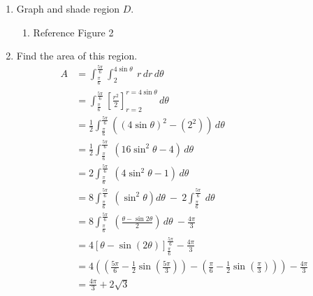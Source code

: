 \documentclass[letter,11pt]{article}
\begin{document}
\begin{enumerate}[label = \roman*.]
	\item Graph and shade region $D$.
	      \begin{enumerate}
	      	\item Reference Figure 2
	      \end{enumerate}
	\item Find the area of this region.
	      \begin{align*}
	      	A & = \int_{\frac{\pi}{6}}^{\frac{5\pi}{6}}\int_{2}^{4\sin\theta}\ r \, dr \,d\theta                                                                                           \\
	      	  & = \int_{\frac{\pi}{6}}^{\frac{5\pi}{6}}\left[\frac{r^2}{2}\right]_{r=2}^{r=4\sin\theta}\,d\theta                                                                           \\
	      	  & = \frac{1}{2}\int_{\frac{\pi}{6}}^{\frac{5\pi}{6}} \left(\left(4\sin\theta\right)^{2}-\left(2^{2}\right)\right) \, d\theta                                                 \\
	      	  & = \frac{1}{2}\int_{\frac{\pi}{6}}^{\frac{5\pi}{6}}\ \left(16\sin^{2}\theta-4\right)\, d\theta                                                                              \\
	      	  & = 2\int_{\frac{\pi}{6}}^{\frac{5\pi}{6}}\ \left(4\sin^{2}\theta-1\right) \, d\theta                                                                                        \\ 
	      	  & = 8\int_{\frac{\pi}{6}}^{\frac{5\pi}{6}}\ \left(\sin^{2}\theta\right)d\theta\ -\ 2\int_{\frac{\pi}{6}}^{\frac{5\pi}{6}}\,d\theta                                           \\
	      	  & = 8\int_{\frac{\pi}{6}}^{\frac{5\pi}{6}}\ \left(\frac{\theta - \sin 2\theta}{2}\right) \, d\theta\ -\frac{4\pi}{3}                                                         \\
	      	  & = 4\left[\theta - \sin(2\theta)\right]_{\frac{\pi}{6}}^{\frac{5\pi}{6}} -\frac{4\pi}{3}                                                                                    \\
	      	  & = 4\left(\left(\frac{5\pi}{6}-\frac{1}{2}\sin\left(\frac{5\pi}{3}\right)\right)-\left(\frac{\pi}{6}-\frac{1}{2}\sin\left(\frac{\pi}{3}\right)\right)\right)-\frac{4\pi}{3} \\
	      	  & = \boxed{\frac{4\pi}{3}+2\sqrt{3}}                                                                                                                                         
	      \end{align*}
\end{enumerate}
\end{document}
